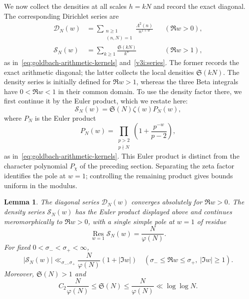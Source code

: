 \documentclass[12pt,a4paper]{amsart}
\numberwithin{equation}{section}
\def\le{\leqslant}
\def\ge{\geqslant}
\theoremstyle{plain}
\newtheorem{lemma}[proposition]{Lemma}
\theoremstyle{definition}
\theoremstyle{remark}
\begin{document}
We now collect the densities at all scales $h=kN$ and record the
exact diagonal. The corresponding Dirichlet series are
\[
 \begin{aligned}
 \mathscr D_N(w)&=\sum_{\substack{n\ge1\\(n,N)=1}}
                       \frac{\Lambda^2(n)}{n^{1+w}}
                       &&(\Re w>0),\\
 \mathscr S_N(w)&=\sum_{k\ge1}\frac{\mathfrak S(kN)}{k^w}
                       &&(\Re w>1),
 \end{aligned}
\]
as in~\eqref{eq:goldbach-arithmetic-kernels} and~\eqref{v3i:series}.
The former records the exact arithmetic diagonal; the latter collects
the local densities $\mathfrak S(kN)$. The density series is
initially defined for $\Re w>1$, whereas the three Beta integrals
have $0<\Re w<1$ in their common domain. To use the density factor
there, we first continue it by the Euler product, which we restate here:
\[
 \mathscr S_N(w)=\mathfrak S(N)\zeta(w)P_N(w),
\]
where $P_N$ is the Euler product
\[
 P_N(w)=\prod_{\substack{p>2\\p\nmid N}}
                  \left(1+\frac{p^{-w}}{p-2}\right),
\]
as in~\eqref{eq:goldbach-arithmetic-kernels}.
This Euler product is distinct from the character polynomial
$P_\chi$ of the preceding section.
Separating the zeta factor identifies the pole at $w=1$; controlling
the remaining product gives bounds uniform in the modulus.

\begin{lemma}\label{proof:lem:singular-N}
The diagonal series $\mathscr D_N(w)$ converges absolutely for
$\Re w>0$. The density series $\mathscr S_N(w)$ has the Euler
product displayed above and continues meromorphically to
$\Re w>0$, with a single simple pole at $w=1$ of residue
\begin{equation}\label{proof:gb:singular-series-residue}
 \operatorname*{Res}_{w=1}\mathscr S_N(w)=\frac N{\varphi(N)}.
\end{equation}
For fixed $0<\sigma_-<\sigma_+<\infty$,
\begin{equation}\label{proof:gb:singular-series-growth}
 |\mathscr S_N(w)|\ll_{\sigma_-,\sigma_+}
 \frac N{\varphi(N)}(1+|\Im w|)
 \quad(\sigma_-\le\Re w\le\sigma_+,\ |\Im w|\ge1).
\end{equation}
Moreover, $\mathfrak S(N)>1$ and
\begin{equation}\label{proof:sp:family-bounds}
 C_2\frac N{\varphi(N)}\le\mathfrak S(N)
       \le\frac N{\varphi(N)}\ll\log\log N.
\end{equation}
\end{lemma}
\end{document}
